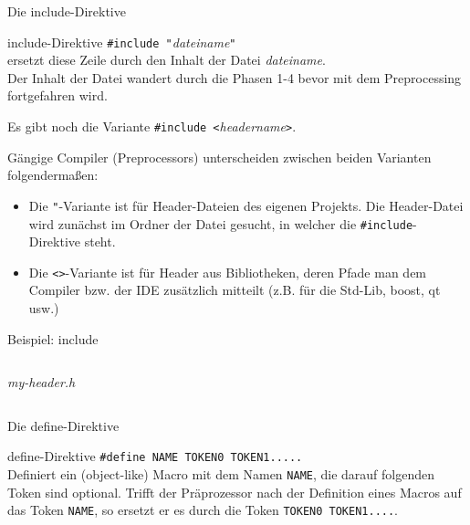 \begin{frame}[fragile]{Die include-Direktive}
	\begin{block}{include-Direktive}
		\verb|#include "|\emph{dateiname}\verb|"| \\
		\vspace{0.5em}
		ersetzt diese Zeile durch den Inhalt der Datei \emph{dateiname}. \\
		Der Inhalt der Datei wandert durch die Phasen 1-4 bevor mit dem Preprocessing fortgefahren wird.
	\end{block}
	
	\pause
	\vspace{1em}
	
	\small
	Es gibt noch die Variante \verb|#include <|\emph{headername}\verb|>|.
	
	Gängige Compiler (Preprocessors) unterscheiden zwischen beiden Varianten folgendermaßen:
	\begin{itemize}
		\item Die \verb|"|-Variante ist für Header-Dateien des eigenen Projekts. Die Header-Datei wird zunächst im Ordner der Datei gesucht, in welcher die \verb|#include|-Direktive steht.
		\item Die \verb|<>|-Variante ist für Header aus Bibliotheken, deren Pfade man dem Compiler bzw. der IDE zusätzlich mitteilt (z.B. für die Std-Lib, boost, qt usw.)
	\end{itemize}
\end{frame}

\begin{frame}{Beispiel: include}
	\footnotesize
	
	\begin{columns}
		\emph{my-header.h}
		
		
		
	\end{columns}
\end{frame}

\begin{frame}[fragile]{Die define-Direktive}
	\begin{block}{define-Direktive}
		\verb|#define NAME TOKEN0 TOKEN1.....| \\
		\vspace{0.5em}
		Definiert ein (object-like) Macro mit dem Namen \verb|NAME|, die darauf folgenden Token sind optional. Trifft der Präprozessor nach der Definition eines Macros auf das Token \verb|NAME|, so ersetzt er es durch die Token \verb|TOKEN0 TOKEN1....|.
	\end{block}
\end{frame}

